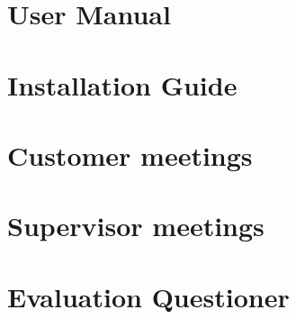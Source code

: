 \chapter{User Manual}

\chapter{Installation Guide}

\chapter{Customer meetings}

\chapter{Supervisor meetings}

\chapter{Evaluation Questioner}